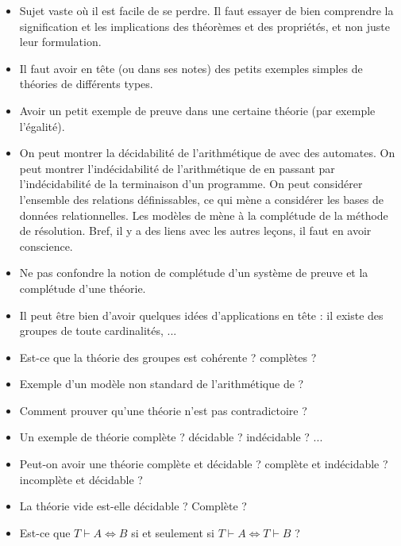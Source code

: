 \documentclass{agregfiche}
\begin{document}
\secpieges

\begin{itemize}
	\item Sujet vaste où il est facile de se perdre. Il faut essayer 
	de bien comprendre la signification et les implications des 
	théorèmes et des propriétés, et non juste leur formulation.
    \item Il faut avoir en tête (ou dans ses notes) des petits 
    exemples simples de théories de différents types.
    \item Avoir un petit exemple de preuve dans une certaine théorie 
    (par exemple l'égalité).
    \item On peut montrer la décidabilité de l'arithmétique de 
     avec des automates. On peut montrer 
    l'indécidabilité 
    de l'arithmétique de  en passant par l'indécidabilité 
    de la 
    terminaison d'un programme. On peut considérer l'ensemble des 
    relations définissables, ce qui mène a considérer les bases de 
    données relationnelles. Les modèles de  mène à la 
    complétude de la méthode de résolution. Bref, il y a des liens 
    avec les autres 
    leçons, il faut en avoir conscience.
    \item Ne pas confondre la notion de complétude d'un système de 
    preuve et la complétude d'une théorie.
    \item Il peut être bien d'avoir quelques idées d'applications en 
    tête : il existe des groupes de toute cardinalités, ...
\end{itemize}

\secquestionsclassiques

\begin{itemize}
	\item Est-ce que la théorie des groupes est cohérente ? complètes 
	?
    \item Exemple d'un modèle non standard de l'arithmétique de 
    ?
    \item Comment prouver qu'une théorie n'est pas contradictoire ?
    \item Un exemple de théorie complète ? décidable ? indécidable ? 
    ...
    \item Peut-on avoir une théorie complète et décidable ? complète 
    et indécidable ? incomplète et décidable ?
    \item La théorie vide est-elle décidable ? Complète ?
    \item  Est-ce que $T \vdash A \Leftrightarrow B$ si et seulement 
    si $T 
    \vdash A \Leftrightarrow T\vdash B$ ?
\end{itemize}
\end{document}

